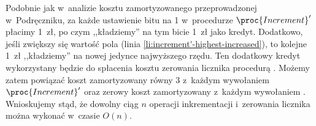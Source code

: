 Podobnie jak w~analizie kosztu zamortyzowanego przeprowadzonej w~Podręczniku, za każde ustawienie bitu na 1 w~procedurze $\proc{Increment}'$ płacimy 1~zł, po czym ,,kładziemy'' na tym bicie 1~zł jako kredyt.
Dodatkowo, jeśli zwiększy się wartość pola  (linia \ref{li:increment'-highest-increased}), to kolejne 1~zł ,,kładziemy'' na nowej jedynce najwyższego rzędu.
Ten dodatkowy kredyt wykorzystany będzie do spłacenia kosztu zerowania licznika procedurą .
Możemy zatem powiązać koszt zamortyzowany równy 3 z~każdym wywołaniem $\proc{Increment}'$ oraz zerowy koszt zamortyzowany z~każdym wywołaniem .
Wnioskujemy stąd, że dowolny ciąg $n$ operacji inkrementacji i~zerowania licznika można wykonać w~czasie $O(n)$.
